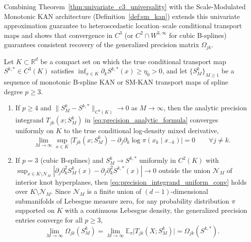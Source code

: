 Combining Theorem~\ref{thm:univariate_c3_universality} with the Scale-Modulated Monotonic KAN architecture (Definition~\ref{def:sm_kan}) extends this univariate approximation guarantee to heteroscedastic location--scale conditional transport maps and shows that convergence in $C^3$ (or $C^2 \cap W^{3,\infty}$ for cubic B-splines) guarantees consistent recovery of the generalized precision matrix $\Omega_{jk}$.

\begin{corollary}
\label{cor:precision_c3_consistency}
Let $K \subset \mathbb{R}^d$ be a compact set on which the true conditional transport map $S^{k,*} \in C^3(K)$ satisfies $\inf_{x \in K} \partial_k S^{k,*}(x) \ge \eta_0 > 0$, and let $\{S^k_M\}_{M \ge 1}$ be a sequence of monotonic B-spline KAN or SM-KAN transport maps of spline degree $p \ge 3$.
\begin{enumerate}
    \item If $p \ge 4$ and $\|S^k_M - S^{k,*}\|_{C^3(K)} \to 0$ as $M \to \infty$, then the analytic precision integrand $T_{jk}(x; S^k_M)$ in \eqref{eq:precision_analytic_formula} converges uniformly on $K$ to the true conditional log-density mixed derivative,
    \begin{equation}
        \lim_{M \to \infty} \sup_{x \in K} \big| T_{jk}(x; S^k_M) - \partial_j \partial_k \log \pi(x_k \mid x_{-k}) \big| = 0 \qquad \forall j \neq k.
        \label{eq:precision_integrand_uniform_conv}
    \end{equation}
    \item If $p = 3$ (cubic B-splines) and $S^k_M \to S^{k,*}$ uniformly in $C^2(K)$ with $\sup_{x \in K \setminus \mathcal{N}_M} |\partial_j \partial_k^2 S^k_M(x) - \partial_j \partial_k^2 S^{k,*}(x)| \to 0$ outside the union $\mathcal{N}_M$ of interior knot hyperplanes, then \eqref{eq:precision_integrand_uniform_conv} holds over $K \setminus \mathcal{N}_M$. Since $\mathcal{N}_M$ is a finite union of $(d-1)$-dimensional submanifolds of Lebesgue measure zero, for any probability distribution $\pi$ supported on $K$ with a continuous Lebesgue density, the generalized precision entries converge for all $p \ge 3$,
    \begin{equation}
        \lim_{M \to \infty} \Omega_{jk}(S^k_M) = \lim_{M \to \infty} \mathbb{E}_\pi\big|T_{jk}(X; S^k_M)\big| = \Omega_{jk}(S^{k,*}).
        \label{eq:omega_consistency_limit}
    \end{equation}
\end{enumerate}
\end{corollary}

